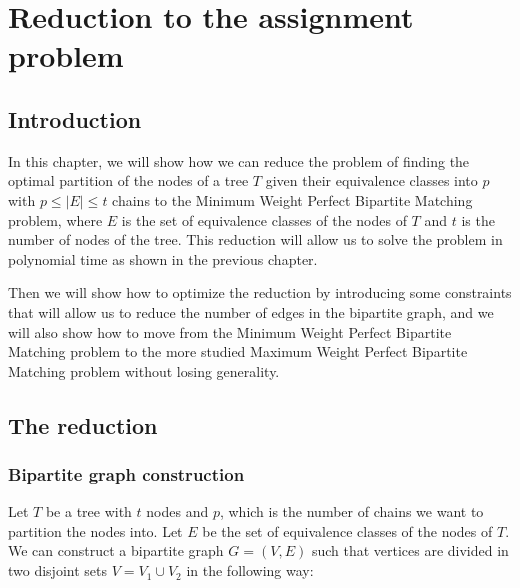 \chapter{Reduction to the assignment problem} \label{chp:reduction_to_min_weight_matching}

\section{Introduction}
In this chapter, we will show how we can reduce the problem of finding the optimal partition of the nodes of a tree $T$ given their equivalence classes into $p$ with $p \leq |E| \leq t$ chains to the Minimum Weight Perfect Bipartite Matching problem, where $E$ is the set of equivalence classes of the nodes of $T$ and $t$ is the number of nodes of the tree. This reduction will allow us to solve the problem in polynomial time as shown in the previous chapter.

Then we will show how to optimize the reduction by introducing some constraints that will allow us to reduce the number of edges in the bipartite graph, and we will also show how to move from the Minimum Weight Perfect Bipartite Matching problem to the more studied Maximum Weight Perfect Bipartite Matching problem without losing generality.

\section{The reduction}
\subsection{Bipartite graph construction}
Let $T$ be a tree with $t$ nodes and $p$, which is the number of chains we want to partition the nodes into. Let $E$ be the set of equivalence classes of the nodes of $T$. We can construct a bipartite graph $G = (V, E)$ such that vertices are divided in two disjoint sets $V = V_1 \cup V_2$ in the following way:

